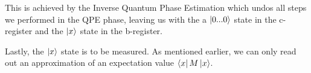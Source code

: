 This is achieved by the Inverse Quantum Phase Estimation which undos all steps we performed in the QPE phase, leaving us with the a $\ket{0...0}$ state in the c-register and the $\ket x$ state in the b-register.

Lastly, the $\ket x$ state is to be measured. As mentioned earlier, we can only read out an approximation of an expectation value $\bra x M \ket x$.
